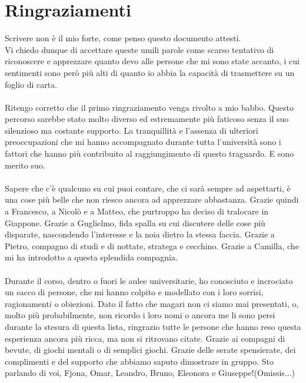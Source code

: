 \chapter*{Ringraziamenti}

Scrivere non è il mio forte, come penso questo documento attesti.\\
Vi chiedo dunque di accettare queste umili parole
come scarso tentativo di riconoscere e apprezzare quanto devo
alle persone che mi sono state accanto,
i cui sentimenti sono però più alti di quanto io
abbia la capacità di trasmettere su un foglio di carta.\\
\\
Ritengo corretto che il primo ringraziamento venga rivolto a mio babbo.
Questo percorso sarebbe stato molto diverso ed
estremamente più faticoso senza il suo silenzioso ma costante supporto.
La tranquillità e l'assenza di ulteriori preoccupazioni
che mi hanno accompagnato durante tutta l'università sono
i fattori che hanno più contribuito al raggiungimento di questo traguardo.
E sono merito suo.\\
\\
Sapere che c'è qualcuno su cui puoi contare,
che ci sarà sempre ad aspettarti, 
è una cose più belle che non riesco ancora ad apprezzare abbastanza.
Grazie quindi a Francesco, a Nicolò e a Matteo, che purtroppo ha deciso di tralocare in Giappone.
Grazie a Guglielmo, fida spalla su cui discutere delle cose più disparate,
nascondendo l'interesse e la noia dietro la stessa faccia.
Grazie a Pietro, compagno di studi e di nottate,
stratega e cecchino.
Grazie a Camilla, che mi ha introdotto a questa splendida compagnia.\\
\\
Durante il corso, dentro o fuori le aulee universitarie,
ho conosciuto e incrociato un sacco di persone,
che mi hanno colpito e modellato con i loro sorrisi,
ragionamenti o obiezioni.
Dato il fatto che magari non ci siamo mai presentati,
o, molto più probabilmente, non ricordo i loro nomi o
ancora me li sono persi durante la stesura di questa lista,
ringrazio tutte le persone che hanno reso questa esperienza ancora più ricca, 
ma non si ritrovano citate.
\clearpage
Grazie ai compagni di bevute, di giochi mentali o di semplici giochi.
Grazie delle serate spensierate, dei complimenti 
e del supporto che abbiamo saputo dimostrare in gruppo.
Sto parlando di voi, Fjona, Omar, Leandro, Bruno, Eleonora e Giuseppe!(Omissis...)\\
\\

